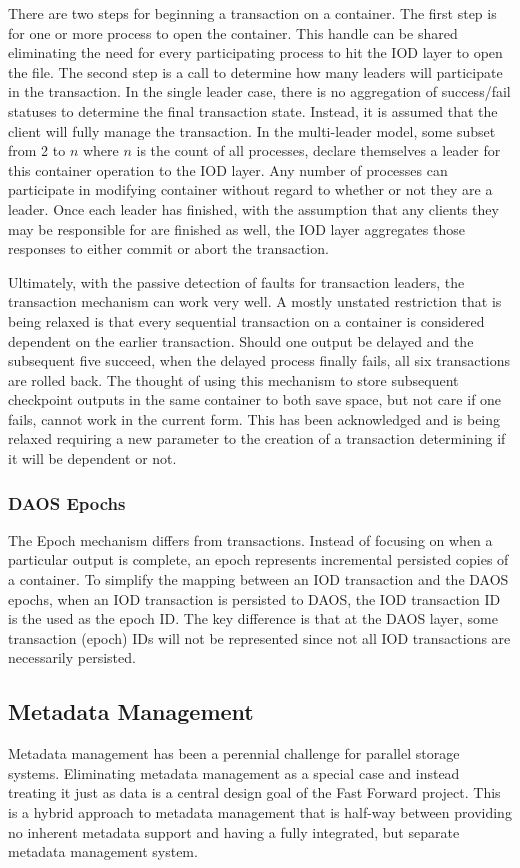 \documentclass[conference]{IEEEtran}
\begin{document}
There are two steps for beginning a transaction on a container. The first step
is for one or more process to open the container. This handle can be shared
eliminating the need for every participating process to hit the IOD layer to
open the file. The second step is a call to determine how many leaders will
participate in the transaction. In the single leader case, there is no
aggregation of success/fail statuses to determine the final transaction state.
Instead, it is assumed that the client will fully manage the transaction. In
the multi-leader model, some subset from 2 to $n$ where $n$ is the count of all
processes, declare themselves a leader for this container operation to the IOD
layer. Any number of processes can participate in modifying container without
regard to whether or not they are a leader. Once each leader has finished, with
the assumption that any clients they may be responsible for are finished as
well, the IOD layer aggregates those responses to either commit or abort the
transaction.

Ultimately, with the passive detection of faults for transaction leaders, the
transaction mechanism can work very well. A mostly unstated restriction that is
being relaxed is that every sequential transaction on a container is considered
dependent on the earlier transaction. Should one output be delayed and the
subsequent five succeed, when the delayed process finally fails, all six
transactions are rolled back. The thought of using this mechanism to store
subsequent checkpoint outputs in the same container to both save space, but not
care if one fails, cannot work in the current form. This has been acknowledged
and is being relaxed requiring a new parameter to the creation of a transaction
determining if it will be dependent or not.

\subsubsection{DAOS Epochs}
The Epoch mechanism differs from transactions. Instead of focusing on when a
particular output is complete, an epoch represents incremental persisted copies
of a container. To simplify the mapping between an IOD transaction and the DAOS
epochs, when an IOD transaction is persisted to DAOS, the IOD transaction ID is
the used as the epoch ID. The key difference is that at the DAOS layer, some
transaction (epoch) IDs will not be represented since not all IOD transactions
are necessarily persisted.

\subsection{Metadata Management}
Metadata management has been a perennial challenge for parallel storage
systems.  Eliminating metadata management as a special case and instead
treating it just as data is a central design goal of the Fast Forward project.
This is a hybrid approach to metadata management that is half-way between
providing no inherent metadata support and having a fully integrated, but
separate metadata management system.
\end{document}
